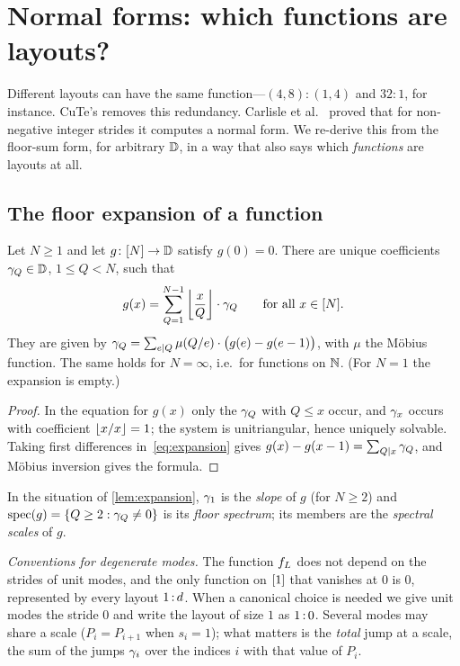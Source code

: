 \section{Normal forms: which functions are layouts?}\label{sec:normalform}

Different layouts can have the same function---$(4,8):(1,4)$ and $32:1$, for instance. CuTe's
 removes this redundancy. Carlisle et al.~\cite{carlisle2026} proved that for
non-negative integer strides it computes a normal form. We re-derive this from the floor-sum form,
for arbitrary $\mathbb{D}$, in a way that also says which \emph{functions} are layouts at all.

\subsection{The floor expansion of a function}

\begin{lemma}\label{lem:expansion}
Let $N\ge1$ and let $g\colon[N]\to\mathbb{D}$ satisfy $g(0)=0$. There are unique coefficients
$\gamma_Q\in\mathbb{D}$, $1\le Q<N$, such that
\begin{equation}\label{eq:expansion}
 g(x)=\sum_{Q=1}^{N-1}\left\lfloor \frac{x}{Q} \right\rfloor\cdot\gamma_Q\qquad\text{for all }x\in[N] .
\end{equation}
They are given by $\gamma_Q=\sum_{e\mid Q}\mu(Q/e)\cdot\bigl(g(e)-g(e-1)\bigr)$, with $\mu$ the
M\"obius function. The same holds for $N=\infty$, i.e.\ for functions on $\mathbb{N}$.
{\rm(}For $N=1$ the expansion is empty.{\rm)}
\end{lemma}
\begin{proof}
In the equation for $g(x)$ only the $\gamma_Q$ with $Q\le x$ occur, and $\gamma_x$ occurs with
coefficient $\left\lfloor x/x \right\rfloor=1$; the system is unitriangular, hence uniquely solvable. Taking first
differences in~\eqref{eq:expansion} gives $g(x)-g(x-1)=\sum_{Q\mid x}\gamma_Q$, and M\"obius
inversion gives the formula.
\end{proof}

\begin{definition}
In the situation of \cref{lem:expansion}, $\gamma_1$ is the \emph{slope} of $g$ (for $N\ge2$) and
$\operatorname{spec}(g)=\{Q\ge2:\gamma_Q\neq0\}$ is its \emph{floor spectrum}; its members are the
\emph{spectral scales} of $g$.
\end{definition}

\noindent\emph{Conventions for degenerate modes.} The function $f_{L}$ does not depend on the
strides of unit modes, and the only function on $[1]$ that vanishes at $0$ is $0$, represented
by every layout $1\,{:}\,d$. When a canonical choice is needed we give unit modes the stride $0$ and write the
layout of size $1$ as $1\,{:}\,0$. Several modes may share a scale ($P_i=P_{i+1}$ when $s_i=1$); what
matters is the \emph{total} jump at a scale, the sum of the jumps $\gamma_i$ over the indices $i$
with that value of $P_i$.

